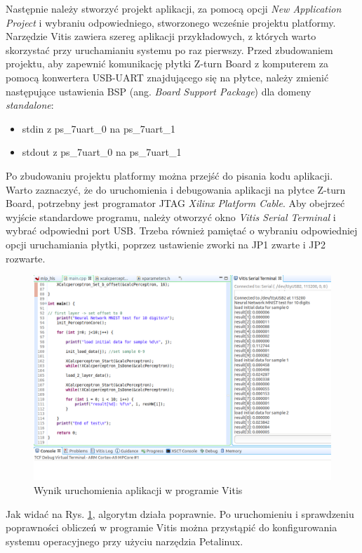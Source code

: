 Następnie należy stworzyć projekt aplikacji, za pomocą opcji \emph{New Application Project} i wybraniu odpowiedniego, 
stworzonego wcześnie projektu platformy. Narzędzie Vitis zawiera szereg aplikacji przykładowych, z których warto 
skorzystać przy uruchamianiu systemu po raz pierwszy. Przed zbudowaniem projektu, aby zapewnić komunikację płytki 
Z-turn Board z komputerem za pomocą konwertera USB-UART znajdującego się na płytce, należy zmienić następujące 
ustawienia BSP (ang. \emph{Board Support Package}) dla domeny \emph{standalone}:

\begin{itemize}
  \item stdin z ps\_7uart\_0 na ps\_7uart\_1
  \item stdout z ps\_7uart\_0 na ps\_7uart\_1
\end{itemize}

Po zbudowaniu projektu platformy można przejść do pisania kodu aplikacji. Warto zaznaczyć, że do uruchomienia i 
debugowania aplikacji na płytce Z-turn Board, potrzebny jest programator JTAG \emph{Xilinx Platform Cable}. Aby 
obejrzeć wyjście standardowe programu, należy otworzyć okno \emph{Vitis Serial Terminal} i wybrać odpowiedni port USB. 
Trzeba również pamiętać o wybraniu odpowiedniej opcji uruchamiania płytki, poprzez ustawienie zworki na JP1 zwarte i 
JP2 rozwarte.

\begin{figure}[!h]
  \centering
  \includegraphics[width=\textwidth]{img/vitis-results.png}
  \caption{Wynik uruchomienia aplikacji w programie Vitis}
  \label{vitis-results}
\end{figure}

Jak widać na Rys. \ref{vitis-results}, algorytm działa poprawnie. Po uruchomieniu i sprawdzeniu poprawności obliczeń w 
programie Vitis można przystąpić do konfigurowania systemu operacyjnego przy użyciu narzędzia Petalinux. 

